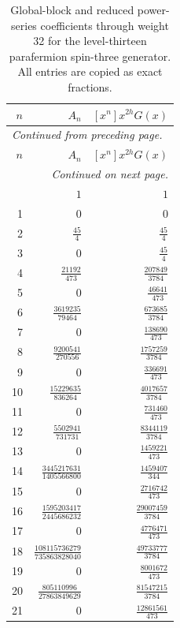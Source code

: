 \begingroup\small
\setlength{\tabcolsep}{5pt}
\begin{longtable}{rrr}
\caption{Global-block and reduced power-series coefficients through weight 32 for the level-thirteen parafermion spin-three generator. All entries are copied as exact fractions.}\label{expphysics:blocks-PF13}\\
\toprule
$n$ & $A_n$ & $[x^n]x^{2h}G(x)$\\
\midrule
\endfirsthead
\multicolumn{3}{l}{\small\itshape Continued from preceding page.}\\
\toprule
$n$ & $A_n$ & $[x^n]x^{2h}G(x)$\\
\midrule
\endhead
\midrule
\multicolumn{3}{r}{\small\itshape Continued on next page.}\\
\endfoot
\bottomrule
\endlastfoot
0 & $1$ & $1$\\
1 & $0$ & $0$\\
2 & $\frac{45}{4}$ & $\frac{45}{4}$\\
3 & $0$ & $\frac{45}{4}$\\
4 & $\frac{21192}{473}$ & $\frac{207849}{3784}$\\
5 & $0$ & $\frac{46641}{473}$\\
6 & $\frac{3619235}{79464}$ & $\frac{673685}{3784}$\\
7 & $0$ & $\frac{138690}{473}$\\
8 & $\frac{9200541}{270556}$ & $\frac{1757259}{3784}$\\
9 & $0$ & $\frac{336691}{473}$\\
10 & $\frac{15229635}{836264}$ & $\frac{4017657}{3784}$\\
11 & $0$ & $\frac{731460}{473}$\\
12 & $\frac{5502941}{731731}$ & $\frac{8344119}{3784}$\\
13 & $0$ & $\frac{1459221}{473}$\\
14 & $\frac{3445217631}{1405566800}$ & $\frac{1459407}{344}$\\
15 & $0$ & $\frac{2716742}{473}$\\
16 & $\frac{1595203417}{2445686232}$ & $\frac{29007459}{3784}$\\
17 & $0$ & $\frac{4776471}{473}$\\
18 & $\frac{108115736279}{735863828040}$ & $\frac{49733777}{3784}$\\
19 & $0$ & $\frac{8001672}{473}$\\
20 & $\frac{805110996}{27863849629}$ & $\frac{81547215}{3784}$\\
21 & $0$ & $\frac{12861561}{473}$\\

\end{longtable}
